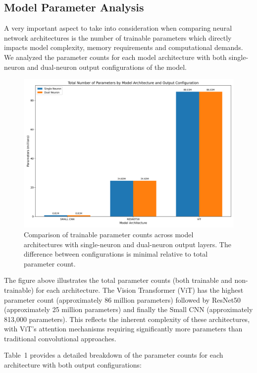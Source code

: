 \subsection{Model Parameter Analysis}

A very important aspect to take into consideration when comparing neural network architectures is the number of trainable parameters which directly impacts model complexity, memory requirements and computational demands. We analyzed the parameter counts for each model architecture with both single-neuron and dual-neuron output configurations of the model.

\begin{figure}[htbp]
\centering
\includegraphics[width=\textwidth]{figures/parameter_count_comparison.png}
\caption{Comparison of trainable parameter counts across model architectures with single-neuron and dual-neuron output layers. The difference between configurations is minimal relative to total parameter count.}
\end{figure}

The figure above illustrates the total parameter counts (both trainable and non-trainable) for each architecture. The Vision Transformer (ViT) has the highest parameter count (approximately 86 million parameters) followed by ResNet50 (approximately 25 million parameters) and finally the Small CNN (approximately 813,000 parameters). This reflects the inherent complexity of these architectures, with ViT's attention mechanisms requiring significantly more parameters than traditional convolutional approaches.

Table~1 provides a detailed breakdown of the parameter counts for each architecture with both output configurations:

